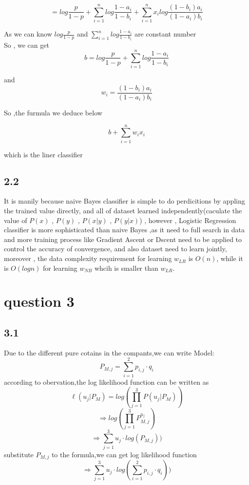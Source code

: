 \documentclass[a4paper,12pt]{article}
\begin{document}
$$=log\frac{p}{1-p}+\sum\limits_{i=1}^nlog\frac{1-a_i}{1-b_i} + \sum\limits_{i=1}^nx_ilog\frac{(1-b_i)a_i}{(1-a_i)b_i} $$

As we can know $log\frac{p}{1-p}$ and $\sum\limits_{i=1}^nlog\frac{1-a_i}{1-b_i}$ are constant number\\

So , we can get 
$$b = log\frac{p}{1-p} + \sum\limits_{i=1}^nlog\frac{1-a_i}{1-b_i} $$

and
$$w_i = \frac{(1-b_i)a_i}{(1-a_i)b_i} $$

So ,the furmula we deduce below 

$$b + \sum\limits_{i=1}^n w_i x_i $$

which is the liner classifier\\


\newpage
\subsection*{2.2}
It is manily because naive Bayes classifier is simple to do perdicitions by appling the trained value directly, and all of dataset learned independently(caculate the value of $P(x)$ , $P(y)$  , $P(x|y)$ , $ P(y|x)$) , however , Logistic Regression classifier is more sophisticated than naive Bayes ,as it need to full search in data and more training process like Gradient Ascent or Dscent need to be applied to control the accuracy of convergence, and also dataset need to learn jointly, moreover , the data complexity requirement for learning $w_{LR}$ is $O(n)$, while it is $O(log⁡n)$ for learning $w_{NB}$ whcih is smaller than $w_{LR}$.


\section*{question 3}
\subsection*{3.1}
Due to the different pure cotains in the compants,we can write Model:
$$P_{M,j}=\sum\limits_{i=1}^{2}p_{i,j} \cdot q_i $$
according to obervation,the log likelihood function can be written as 
$$\ell(u_j|P_M)=log(\prod\limits_{j=1}^3P(u_j|P_M))$$
$$\Longrightarrow log(\prod_{j=1}^{3} P_{M,j}^{u_j} )$$
$$\Longrightarrow \sum\limits_{j=1}^{3}u_j \cdot log(P_{M,j})) $$
substitute $P_{M,j}$ to the formula,we can get log likelihood function
$$\Longrightarrow \sum\limits_{j=1}^{3}u_j \cdot log(\sum\limits_{i=1}^{2}p_{i,j} \cdot q_i)) $$
\end{document}
